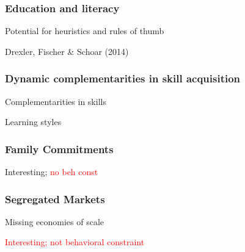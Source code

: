 \documentclass[hideothersubsections, usenames,dvipsnames,11pt]{beamer}
\newenvironment{itemize_2pt}{\itemize\addtolength{\itemsep}{2pt}}{\enditemize}
\begin{document}
\begin{frame}
\frametitle{Education and literacy}

Potential for heuristics and rules of thumb
\begin{itemize_2pt}
	\item Drexler, Fischer \& Schoar (2014) \citep{Drexler2014}
	\vspace{0.1in}
\end{itemize_2pt}
\end{frame}

\begin{frame}
\frametitle{Dynamic complementarities in skill acquisition}

Complementarities in skills
\begin{itemize_2pt}
	\item
\end{itemize_2pt}

\vspace{1.0em}

Learning styles
\begin{itemize_2pt}
	\item
\end{itemize_2pt}

\end{frame}

\begin{frame}
\frametitle{Family Commitments}
\begin{itemize_2pt}
	\item Interesting; \textcolor{red}{no beh const}
	\vspace{0.1in}
\end{itemize_2pt}
\end{frame}

\begin{frame}
\frametitle{Segregated Markets}
\begin{itemize_2pt}
	\item Missing economies of scale
	\item \textcolor{red}{Interesting; not behavioral constraint}
	\vspace{0.1in}
\end{itemize_2pt}
\end{frame}

\end{document}
